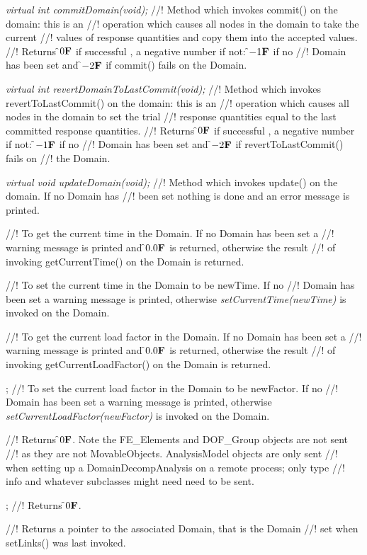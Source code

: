 {\em virtual int commitDomain(void);}
//! Method which invokes commit() on the domain: this is an
//! operation which causes all nodes in the domain to take the current
//! values of response quantities and copy them into the accepted values. 
//! Returns \f$0{\bf F}$ if successful , a negative number if not: \f$-1{\bf F}$ if no
//! Domain has been set and \f$-2{\bf F}$ if commit() fails on the Domain.

{\em virtual int revertDomainToLastCommit(void);}
//! Method which invokes revertToLastCommit() on the domain: this is an
//! operation which causes all nodes in the domain to set the trial
//! response quantities equal to the last committed response quantities.
//! Returns \f$0{\bf F}$ if successful , a negative number if not: \f$-1{\bf F}$ if no
//! Domain has been set and \f$-2{\bf F}$ if \p revertToLastCommit() fails on
//! the Domain. 

{\em virtual void updateDomain(void);}
//! Method which invokes update() on the domain. If no Domain has
//! been set nothing is done and an error message is printed. 

//! To get the current time in the Domain. If no Domain has been set a
//! warning message is printed and \f$0.0{\bf F}$ is returned, otherwise the result
//! of invoking getCurrentTime() on the Domain is returned.

//! To set the current time in the Domain to be \p newTime. If no
//! Domain has been set a warning message is printed, otherwise 
{\em setCurrentTime(newTime)} is invoked on the Domain.

//! To get the current load factor in the Domain. If no Domain has been set a
//! warning message is printed and \f$0.0{\bf F}$ is returned, otherwise the result
//! of invoking getCurrentLoadFactor() on the Domain is returned.

;
//! To set the current load factor in the Domain to be \p newFactor. If no
//! Domain has been set a warning message is printed, otherwise 
{\em setCurrentLoadFactor(newFactor)} is invoked on the Domain.

//! Returns \f$0{\bf F}$. Note the FE\_Elements and DOF\_Group objects are not sent
//! as they are not MovableObjects. AnalysisModel objects are only sent
//! when setting up a DomainDecompAnalysis on a remote process; only type
//! info and whatever subclasses might need need to be sent.

\indent{};
//! Returns \f$0{\bf F}$.

//! Returns a pointer to the associated Domain, that is the Domain
//! set when setLinks() was last invoked. 


